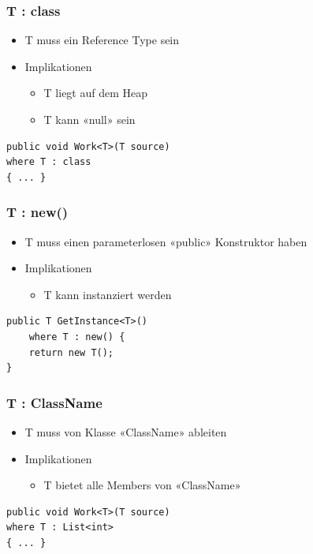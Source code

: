 \subsubsection{T : class}
\begin{itemize}
    \item T muss ein Reference Type sein
    \item Implikationen
    \begin{itemize}
        \item T liegt auf dem Heap
        \item T kann «null» sein
    \end{itemize}
\end{itemize}
\begin{lstlisting}
public void Work<T>(T source)
where T : class
{ ... }
\end{lstlisting}

\subsubsection{T : new()}
\begin{itemize}
    \item T muss einen parameterlosen «public» Konstruktor haben
    \item Implikationen
    \begin{itemize}
        \item  T kann instanziert werden
    \end{itemize}
\end{itemize}
\begin{lstlisting}
public T GetInstance<T>()
    where T : new() {
    return new T();
}
\end{lstlisting}

\subsubsection{T : ClassName}
\begin{itemize}
    \item T muss von Klasse «ClassName» ableiten
    \item Implikationen
    \begin{itemize}
        \item T bietet alle Members von «ClassName»
    \end{itemize}
\end{itemize}
\begin{lstlisting}
public void Work<T>(T source)
where T : List<int>
{ ... }
\end{lstlisting}

